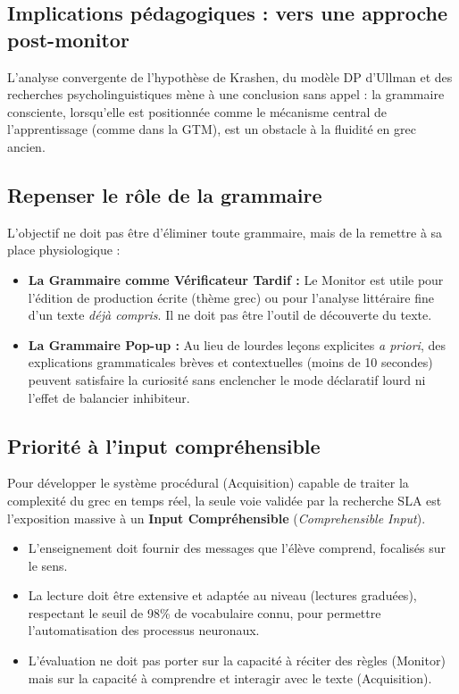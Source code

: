 \subsection{Implications pédagogiques : vers une approche post-monitor}

L'analyse convergente de l'hypothèse de Krashen, du modèle DP d'Ullman et des recherches
psycholinguistiques mène à une conclusion sans appel : la grammaire consciente, lorsqu'elle est
positionnée comme le mécanisme central de l'apprentissage (comme dans la GTM), est un obstacle à la
fluidité en grec ancien.



\subsection{Repenser le rôle de la grammaire}

L'objectif ne doit pas être d'éliminer toute grammaire, mais de la remettre à sa place physiologique
:

\begin{itemize}\item \textbf{La Grammaire comme Vérificateur Tardif :} Le Monitor est utile pour l'édition de production écrite (thème grec) ou pour l'analyse littéraire fine d'un texte \textit{déjà compris}. Il ne doit pas être l'outil de découverte du texte.\item \textbf{La Grammaire \og Pop-up\fg{} :} Au lieu de lourdes leçons explicites \textit{a priori}, des explications grammaticales brèves et contextuelles (moins de 10 secondes) peuvent satisfaire la curiosité sans enclencher le mode déclaratif lourd ni l'effet de balancier inhibiteur.\cite{II-2-3-ref12}\end{itemize}

\subsection{Priorité à l'input compréhensible}

Pour développer le système procédural (Acquisition) capable de traiter la complexité du grec en
temps réel, la seule voie validée par la recherche SLA est l'exposition massive à un \textbf{Input
Compréhensible} (\textit{Comprehensible Input}).

\begin{itemize}\item L'enseignement doit fournir des messages que l'élève comprend, focalisés sur le sens.\item La lecture doit être extensive et adaptée au niveau (lectures graduées), respectant le seuil de 98\% de vocabulaire connu, pour permettre l'automatisation des processus neuronaux.\item L'évaluation ne doit pas porter sur la capacité à réciter des règles (Monitor) mais sur la capacité à comprendre et interagir avec le texte (Acquisition).\cite{II-2-3-ref1}\end{itemize}

